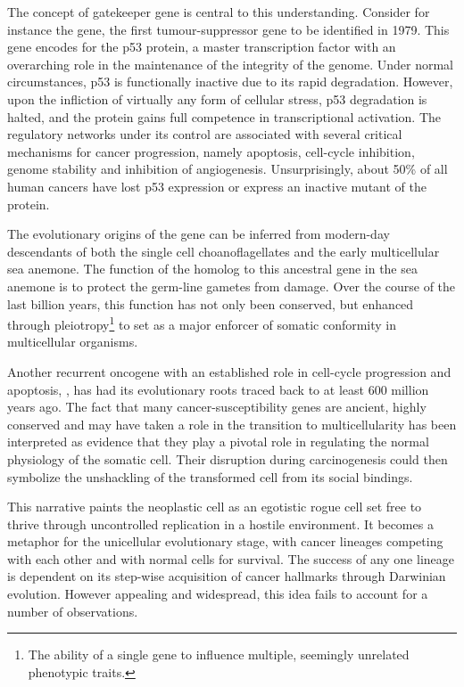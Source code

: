 The concept of gatekeeper gene is central to this understanding.  Consider for
instance the  gene, the first \mbox{tumour-suppressor}
gene to be identified in 1979.  This gene encodes for the p53 protein, a master
transcription factor with an overarching role in the maintenance of the
integrity of the genome.\cite{efeyan_p53:_2007} Under normal circumstances, p53
is functionally inactive due to its rapid degradation.  However, upon the
infliction of virtually any form of cellular stress, p53 degradation is halted,
and the protein gains full competence in transcriptional activation.  The
regulatory networks under its control are associated with several critical
mechanisms for cancer progression, namely apoptosis, \mbox{cell-cycle}
inhibition, genome stability and inhibition of
angiogenesis.\cite{vogelstein_surfing_2000} Unsurprisingly, about 50\% of all
human cancers have lost p53 expression or express an inactive mutant of the
protein.\cite{toledo_regulating_2006}

The evolutionary origins of the  gene can be inferred
from modern-day descendants of both the single cell choanoflagellates and the
early multicellular sea anemone.  The function of the homolog to this ancestral
gene in the sea anemone is to protect the germ-line gametes from 
damage.\cite{belyi_origins_2010} Over the course of the last billion years, this
function has not only been conserved, but enhanced through
pleiotropy\footnote{The ability of a single gene to influence multiple,
  seemingly unrelated phenotypic traits.} to set  as a
major enforcer of somatic conformity in multicellular organisms.

Another recurrent oncogene with an established role in \mbox{cell-cycle}
progression and apoptosis, , has had its evolutionary
roots traced back to at least 600 million years ago.\cite{hartl_stem_2010} The
fact that many cancer-susceptibility genes are ancient, highly conserved and may
have taken a role in the transition to
multicellularity\cite{srivastava_amphimedon_2010} has been interpreted as
evidence that they play a pivotal role in regulating the normal physiology of
the somatic cell.\cite{weinberg_oncogenes_1983,weinberg_biology_2013}  Their
disruption during carcinogenesis could then symbolize the unshackling of the
transformed cell from its social bindings.

This narrative paints the neoplastic cell as an egotistic rogue cell set free to
thrive through uncontrolled replication in a hostile environment.  It becomes a
metaphor for the unicellular evolutionary stage, with cancer lineages competing
with each other and with normal cells for survival.\cite{merlo_cancer_2006} The
success of any one lineage is dependent on its \mbox{step-wise} acquisition of
cancer hallmarks through Darwinian evolution.  However appealing and widespread,
this idea fails to account for a number of
observations.\cite{davies_cancer_2011}

